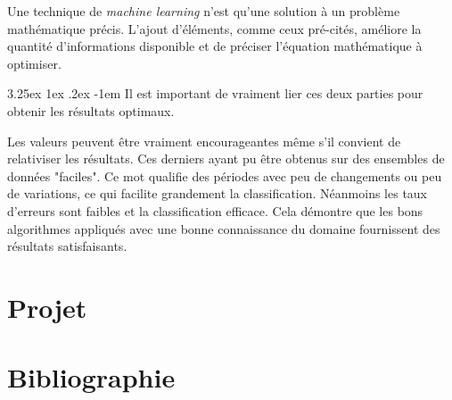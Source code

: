 \documentclass[a4paper, 11pt]{article}
\makeatletter
\renewcommand\paragraph{\@startsection{paragraph}{5}{\z@}%
  {3.25ex \@plus1ex \@minus.2ex}%
  {-1em}%
  {\normalfont\normalsize\bfseries}}
\makeatother
\begin{document}
Une technique de \textit{machine learning} n'est qu'une solution à un problème mathématique précis. L'ajout d'éléments, comme ceux pré-cités, améliore la quantité d'informations disponible et de préciser l'équation mathématique à optimiser.

\paragraph{}
Il est important de vraiment lier ces deux parties pour obtenir les résultats optimaux.

Les valeurs peuvent être vraiment encourageantes même s'il convient de relativiser les résultats. Ces derniers ayant pu être obtenus sur des ensembles de données "faciles". Ce mot qualifie des périodes avec peu de changements ou peu de variations, ce qui facilite grandement la classification.
Néanmoins les taux d'erreurs sont faibles et la classification efficace.
Cela démontre que les bons algorithmes appliqués avec une bonne connaissance du domaine fournissent des résultats satisfaisants. 


\newpage
\section{Projet}
\newpage
\section{Bibliographie}
\end{document}
